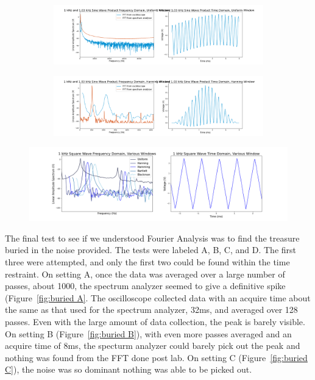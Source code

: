 \documentclass[12pt]{article}
\begin{document}
    \begin{figure}[!ht]
        \centering
        \begin{subfigure}[h]{\textwidth}
        \includegraphics[width=\textwidth]{1 kHz and 1_03 kHz Sine Wave Product (uniform)}
        \caption{}
        \label{fig:sine product}
        \end{subfigure}
        \begin{subfigure}[h]{\textwidth}
        \includegraphics[width=\textwidth]{1 kHz and 1_03 kHz Sine Wave Product (hanning)}
        \caption{}
        \label{fig:sine product}
        \end{subfigure}
    \end{figure} %
    
    \begin{figure}
    \centering
        \includegraphics[width=\textwidth]{Variety of Windows}
        \caption{}
        \label{fig:various windows}
    \end{figure} %
    
    The final test to see if we understood Fourier Analysis was to find the treasure buried in the noise provided. The tests were labeled A, B, C, and D. The first three were attempted, and only the first two could be found within the time restraint. On setting A, once the data was averaged over a large number of passes, about 1000, the spectrum analyzer seemed to give a definitive spike (Figure~\ref{fig:buried A}. The oscilloscope collected data with an acquire time about the same as that used for the spectrum analyzer, 32ms, and averaged over 128 passes. Even with the large amount of data collection, the peak is barely visible. On setting B (Figure~\ref{fig:buried B}), with even more passes averaged and an acquire time of 8ms, the specturm analyzer could barely pick out the peak and nothing was found from the FFT done post lab. On setting C (Figure~\ref{fig:buried C}), the noise was so dominant nothing was able to be picked out. 
    
\end{document}
